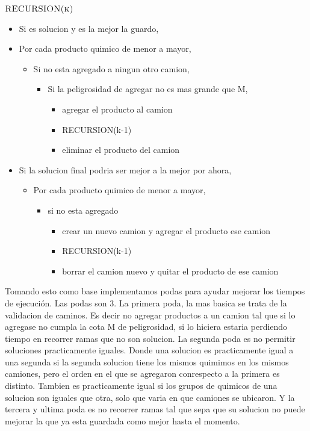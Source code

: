 $\textnormal{\scshape RECURSION(k)}$
\begin{itemize}
\item Si es solucion y es la mejor la guardo,					
\item Por cada producto quimico de menor a mayor, 					
	\begin{itemize}
	\item Si no esta agregado a ningun otro camion,							
		\begin{itemize}
		\item Si la peligrosidad de agregar no es mas grande que M,	
			\begin{itemize}
			\item agregar el producto al camion						
			\item RECURSION(k-1)										
			\item eliminar el producto del camion						
			\end{itemize}													
		\end{itemize}												
	\end{itemize}															
\item Si la solucion final podria ser mejor a la mejor por ahora,				
	\begin{itemize}
	\item Por cada producto quimico de menor a mayor,							
		\begin{itemize}
		\item si no esta agregado													
			\begin{itemize}
			\item crear un nuevo camion y agregar el producto ese camion			
			\item RECURSION(k-1)												
			\item borrar el camion nuevo y quitar el producto de ese camion
			\end{itemize}		
		\end{itemize}						
	\end{itemize}			
\end{itemize}



Tomando esto como base implementamos podas para ayudar mejorar los tiempos de ejecuci\'on. Las podas son 3. 
La primera poda, la mas basica se trata de la validacion de caminos. Es decir no agregar productos a un camion tal que si lo agregase no cumpla la cota M de peligrosidad, si lo hiciera estaria perdiendo tiempo en recorrer ramas que no son solucion.
La segunda poda es no permitir soluciones practicamente iguales. Donde una solucion es practicamente igual a una segunda si la segunda solucion tiene los mismos quimimos en los mismos camiones, pero el orden en el que se agregaron conrespecto a la primera es distinto. Tambien es practicamente igual si los grupos de quimicos de una solucion son iguales que otra, solo que varia en que camiones se ubicaron.
Y la tercera y ultima poda es no recorrer ramas tal que sepa que su solucion no puede mejorar la que ya esta guardada como mejor hasta el momento.

